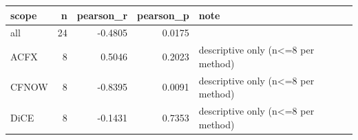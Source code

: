 \begin{tabular}{lrrrl}
\toprule
scope &  n &  pearson\_r &  pearson\_p &                               note \\
\midrule
  all & 24 &    -0.4805 &     0.0175 &                                    \\
 ACFX &  8 &     0.5046 &     0.2023 & descriptive only (n<=8 per method) \\
CFNOW &  8 &    -0.8395 &     0.0091 & descriptive only (n<=8 per method) \\
 DiCE &  8 &    -0.1431 &     0.7353 & descriptive only (n<=8 per method) \\
\bottomrule
\end{tabular}
